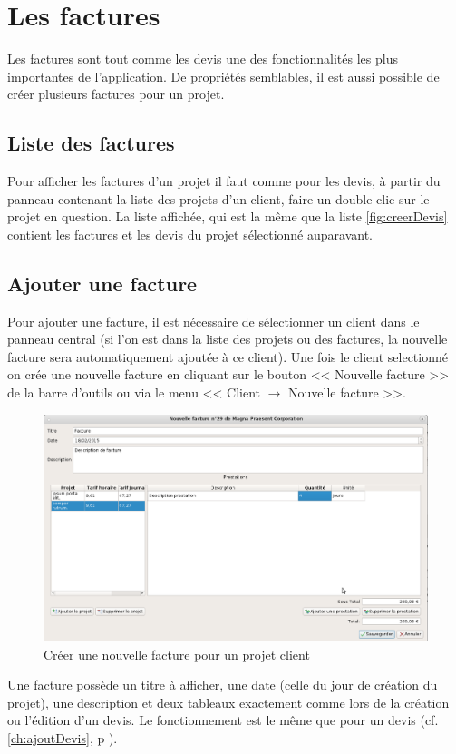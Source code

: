 \chapter{Les factures}
Les factures sont tout comme les devis une des fonctionnalités les plus importantes de l'application. De propriétés semblables, il est aussi possible de créer plusieurs factures pour un projet.
\section{Liste des factures}
Pour afficher les factures d'un projet il faut comme pour les devis, à partir du panneau contenant la liste des projets d'un client, faire un double clic sur le projet en question. La liste affichée, qui est la même que la liste \ref{fig:creerDevis} contient les factures et les devis du projet sélectionné auparavant.

\section{Ajouter une facture}
Pour ajouter une facture, il est nécessaire de sélectionner un client dans le panneau central (si l'on est dans la liste des projets ou des factures, la nouvelle facture sera automatiquement ajoutée à ce client). Une fois le client selectionné on crée une nouvelle facture en cliquant sur le bouton << Nouvelle facture >> de la barre d'outils ou via le menu << Client $\rightarrow$ Nouvelle facture >>. 
\begin{figure}[H]
	\centering
	\includegraphics[width=17cm]{screens/creerFacture.png}
	\caption{Créer une nouvelle facture pour un projet client}
	\label{fig:creerFacture}
\end{figure}
Une facture possède un titre à afficher, une date (celle du jour de création du projet), une description et deux tableaux exactement comme lors de la création ou l'édition d'un devis. Le fonctionnement est le même que pour un devis (cf. \ref*{ch:ajoutDevis}, p \pageref{ch:Prestations}).

